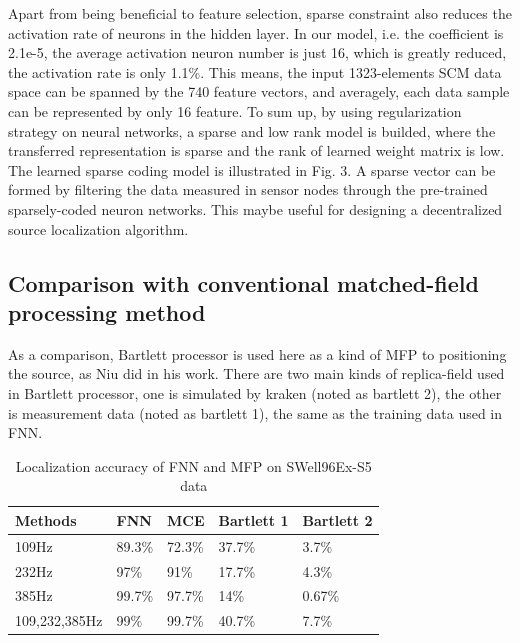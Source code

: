 Apart from being beneficial to feature selection, sparse constraint also reduces the activation rate of neurons in the hidden layer. In our model, i.e. the coefficient is 2.1e-5, the average activation neuron number is just 16, which is greatly reduced, the activation rate is only 1.1{\%}.
This means, the input 1323-elements SCM data space can be spanned by the 740 feature vectors, and averagely, each data sample can be represented by only 16 feature. To sum up, by using regularization strategy on neural networks, a sparse and low rank model is builded, where the transferred representation is sparse and the rank of learned weight matrix is low. The learned sparse coding model is illustrated in Fig. 3.
A sparse vector can be formed by filtering the data measured in sensor nodes through the pre-trained sparsely-coded neuron networks.
This maybe useful for designing a decentralized source localization algorithm.%

\subsection{Comparison with conventional matched-field processing method}
As a comparison, Bartlett processor is used here as a kind of MFP to positioning the source, as Niu did in his work. There are two main kinds of replica-field used in Bartlett processor, one is simulated by kraken (noted as bartlett 2), the other is measurement data (noted as bartlett 1), the same as the training data used in FNN.
\begin{table}[]
\caption{Localization accuracy of FNN and MFP on SWell96Ex-S5 data}
\label{my-label}
\begin{tabular}{@{}lllll@{}}
\toprule
Methods       & FNN    & MCE    & Bartlett 1 & Bartlett 2 \\ \midrule
109Hz         & 89.3\% & 72.3\% & 37.7\%     & 3.7\%      \\
232Hz         & 97\%   & 91\%   & 17.7\%     & 4.3\%      \\
385Hz         & 99.7\% & 97.7\% & 14\%       & 0.67\%     \\
109,232,385Hz & 99\%   & 99.7\% & 40.7\%     & 7.7\%      \\ \bottomrule
\end{tabular}
\end{table}


